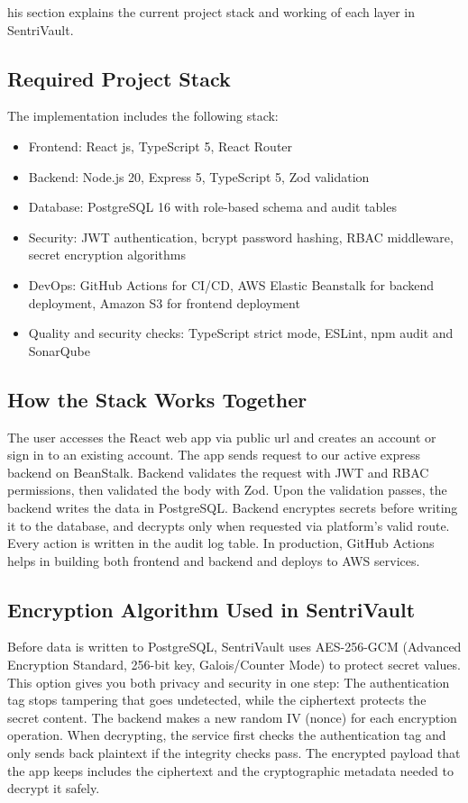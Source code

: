 \documentclass[conference]{IEEEtran}
\begin{document}
\lettrine[findent=2pt]{}{ }his section explains the current project stack and working of each layer in SentriVault.

\subsection{Required Project Stack}

The implementation includes the following stack:

\begin{itemize}
  \item Frontend: React js, TypeScript 5, React Router
  \item Backend: Node.js 20, Express 5, TypeScript 5, Zod validation
  \item Database: PostgreSQL 16 with role-based schema and audit tables
  \item Security: JWT authentication, bcrypt password hashing, RBAC middleware, secret encryption algorithms
  \item DevOps: GitHub Actions for CI/CD, AWS Elastic Beanstalk for backend deployment, Amazon S3 for frontend deployment
  \item Quality and security checks: TypeScript strict mode, ESLint, npm audit and SonarQube
\end{itemize}

\subsection{How the Stack Works Together}

The user accesses the React web app via public url and creates an account or sign in to an existing account. The app sends request to our active express backend on BeanStalk. Backend validates the request with JWT and RBAC permissions, then validated the body with Zod. Upon the validation passes, the backend writes the data in PostgreSQL. Backend encryptes secrets before writing it to the database, and decrypts only when requested via platform's valid route. Every action is written in the audit log table. In production, GitHub Actions helps in building both frontend and backend and deploys to AWS services.


\subsection{Encryption Algorithm Used in SentriVault}

Before data is written to PostgreSQL, SentriVault uses AES-256-GCM (Advanced Encryption Standard, 256-bit key, Galois/Counter Mode) to protect secret values. This option gives you both privacy and security in one step:
The authentication tag stops tampering that goes undetected, while the ciphertext protects the secret content. The backend makes a new random IV (nonce) for each encryption operation.
When decrypting, the service first checks the authentication tag and only sends back plaintext if the integrity checks pass.
The encrypted payload that the app keeps includes the ciphertext and the cryptographic metadata needed to decrypt it safely.
\end{document}
